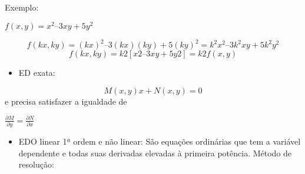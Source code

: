 Exemplo:

$ f(x,y) = x^2 – 3xy+5y^2  $

\begin{equation}
f(kx,ky) =(kx)^2 – 3(kx)(ky) +5(ky)^2 = k^2 x^2 –3k^2 xy+5k^2 y^2 
\end{equation}
\begin{equation}
f(kx,ky) = k 2 [ x 2 –3xy+5y 2 ] = k 2 f(x,y) 
\end{equation}


\begin{itemize}
\item{ED exata:} 
\end{itemize}

\begin{equation}
M(x,y)x + N(x,y) = 0
\end{equation}
e precisa satisfazer a igualdade de

\begin{center}
$ \frac{\partial M}{\partial y} = \frac{\partial N}{\partial x} $
\end{center}



\begin{itemize}
\item{EDO linear 1ª ordem e não linear:} São equações ordinárias que tem a variável dependente e todas suas derivadas elevadas à primeira potência.
Método de resolução: 

\begin{comment}
  Exemplo de uma EDO linear 1ª ordem 

  a1(x)\frac{dy}{dx} + a0(x)y = g(x)
\end{comment}
\end{itemize}



